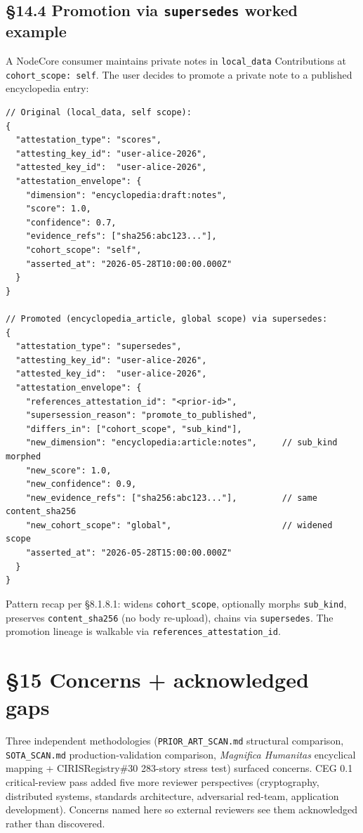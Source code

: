 \documentclass[11pt]{article}
\begin{document}
\subsection*{§14.4 Promotion via \texttt{supersedes} worked example}


A NodeCore consumer maintains private notes in \texttt{local\_data} Contributions at \texttt{cohort\_scope: self}. The user decides to promote a private note to a published encyclopedia entry:


\begin{lstlisting}
// Original (local_data, self scope):
{
  "attestation_type": "scores",
  "attesting_key_id": "user-alice-2026",
  "attested_key_id":  "user-alice-2026",
  "attestation_envelope": {
    "dimension": "encyclopedia:draft:notes",
    "score": 1.0,
    "confidence": 0.7,
    "evidence_refs": ["sha256:abc123..."],
    "cohort_scope": "self",
    "asserted_at": "2026-05-28T10:00:00.000Z"
  }
}

// Promoted (encyclopedia_article, global scope) via supersedes:
{
  "attestation_type": "supersedes",
  "attesting_key_id": "user-alice-2026",
  "attested_key_id":  "user-alice-2026",
  "attestation_envelope": {
    "references_attestation_id": "<prior-id>",
    "supersession_reason": "promote_to_published",
    "differs_in": ["cohort_scope", "sub_kind"],
    "new_dimension": "encyclopedia:article:notes",     // sub_kind morphed
    "new_score": 1.0,
    "new_confidence": 0.9,
    "new_evidence_refs": ["sha256:abc123..."],         // same content_sha256
    "new_cohort_scope": "global",                      // widened scope
    "asserted_at": "2026-05-28T15:00:00.000Z"
  }
}
\end{lstlisting}

Pattern recap per §8.1.8.1: widens \texttt{cohort\_scope}, optionally morphs \texttt{sub\_kind}, preserves \texttt{content\_sha256} (no body re-upload), chains via \texttt{supersedes}. The promotion lineage is walkable via \texttt{references\_attestation\_id}.




\clearpage


\section*{§15 Concerns + acknowledged gaps}


Three independent methodologies (\texttt{PRIOR\_ART\_SCAN.md} structural comparison, \texttt{SOTA\_SCAN.md} production-validation comparison, \textit{Magnifica Humanitas} encyclical mapping + CIRISRegistry\#30 283-story stress test) surfaced concerns. CEG 0.1 critical-review pass added five more reviewer perspectives (cryptography, distributed systems, standards architecture, adversarial red-team, application development). Concerns named here so external reviewers see them acknowledged rather than discovered.
\end{document}
